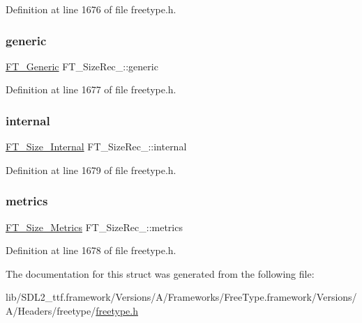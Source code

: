 Definition at line 1676 of file freetype.\+h.

\mbox{\label{struct_f_t___size_rec___aa24520b093a9b4ba9ff388bfe7b9491d}} 
\subsubsection{\texorpdfstring{generic}{generic}}
{\footnotesize\ttfamily \mbox{\hyperlink{fttypes_8h_ae15e8550dd7d863328686aadaead5c77}{F\+T\+\_\+\+Generic}} F\+T\+\_\+\+Size\+Rec\+\_\+\+::generic}



Definition at line 1677 of file freetype.\+h.

\mbox{\label{struct_f_t___size_rec___a236c47ea3138e485c29b0d7baa5cf3b6}} 
\subsubsection{\texorpdfstring{internal}{internal}}
{\footnotesize\ttfamily \mbox{\hyperlink{freetype_8h_a59c5fa003a18285aab769cb96252499c}{F\+T\+\_\+\+Size\+\_\+\+Internal}} F\+T\+\_\+\+Size\+Rec\+\_\+\+::internal}



Definition at line 1679 of file freetype.\+h.

\mbox{\label{struct_f_t___size_rec___a29a6b518d09f6cf1714d9aed01eddc01}} 
\subsubsection{\texorpdfstring{metrics}{metrics}}
{\footnotesize\ttfamily \mbox{\hyperlink{freetype_8h_a8b7a8201f8d155cac76cfb03302c2672}{F\+T\+\_\+\+Size\+\_\+\+Metrics}} F\+T\+\_\+\+Size\+Rec\+\_\+\+::metrics}



Definition at line 1678 of file freetype.\+h.



The documentation for this struct was generated from the following file\+:\begin{DoxyCompactItemize}
\item 
lib/\+S\+D\+L2\+\_\+ttf.\+framework/\+Versions/\+A/\+Frameworks/\+Free\+Type.\+framework/\+Versions/\+A/\+Headers/freetype/\mbox{\hyperlink{freetype_8h}{freetype.\+h}}\end{DoxyCompactItemize}
